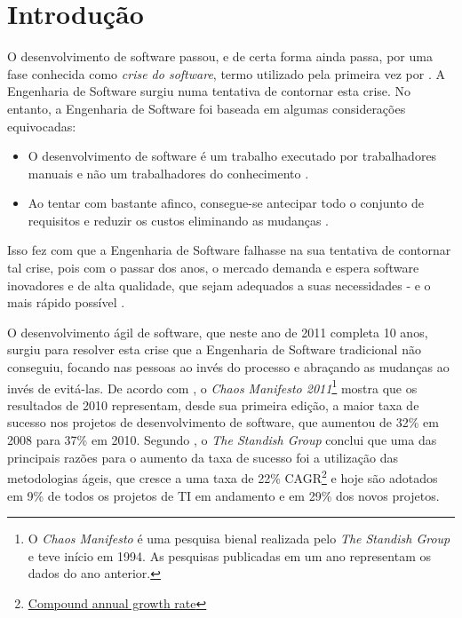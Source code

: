 \chapter{Introdução}

O desenvolvimento de software passou, e de certa forma ainda passa, por uma fase
conhecida como \emph{crise do software}, termo utilizado pela primeira vez por
. A Engenharia de Software surgiu
\cite{NaurRandell} numa tentativa de contornar esta crise. No entanto, a
Engenharia de Software foi baseada em algumas considerações equivocadas:

\begin{itemize}
    \item
        O desenvolvimento de software é um trabalho executado por trabalhadores
        manuais e não um trabalhadores do conhecimento \cite[38]{XPTeles}.
    \item
        Ao tentar com bastante afinco, consegue-se antecipar todo o conjunto de
        requisitos e reduzir os custos eliminando as mudanças
        \cite{TheBusinessOfInnovation}.
\end{itemize}

Isso fez com que a Engenharia de Software falhasse na sua tentativa de contornar
tal crise, pois com o passar dos anos, o mercado demanda e espera software
inovadores e de alta qualidade, que sejam adequados a suas necessidades - e o
mais rápido possível \cite{TheBusinessOfInnovation}.

O desenvolvimento ágil de software, que neste ano de 2011 completa 10 anos,
surgiu \cite{AgileManifesto} para resolver esta crise que a Engenharia de
Software tradicional não conseguiu, focando nas pessoas ao invés do processo e
abraçando as mudanças ao invés de evitá-las. De acordo com
, o \textit{Chaos Manifesto 2011}\footnote{O
\textit{Chaos Manifesto} é uma pesquisa bienal realizada pelo \textit{The
Standish Group} e teve início em 1994. As pesquisas publicadas em um ano
representam os dados do ano anterior.} mostra que os resultados de 2010
representam, desde sua primeira edição, a maior taxa de sucesso nos projetos de
desenvolvimento de software, que aumentou de 32\% em 2008 para 37\% em 2010.
Segundo , o \textit{The Standish Group} conclui
que uma das principais razões para o aumento da taxa de sucesso foi a utilização
das metodologias ágeis, que cresce a uma taxa de 22\%
CAGR\footnote{\href{http://en.wikipedia.org/wiki/Compound_annual_growth_rate}
{Compound annual growth rate}} e hoje são adotados em 9\% de todos os projetos
de TI em andamento e em 29\% dos novos projetos.

